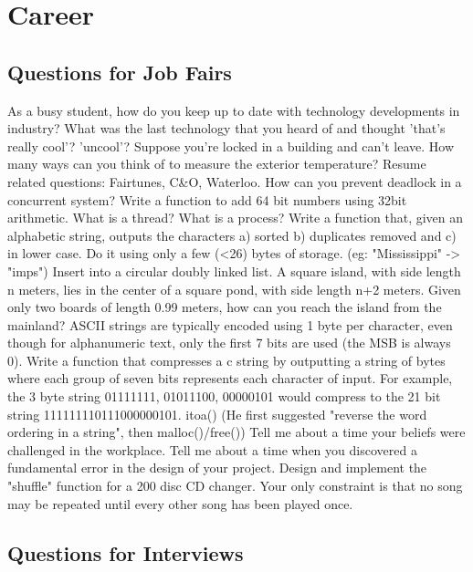 \chapter{Career}
\label{ch:career}

\section{Questions for Job Fairs}
As a busy student, how do you keep up to date with technology developments in industry? 
What was the last technology that you heard of and thought 'that's really cool'? 'uncool'? 
Suppose you're locked in a building and can't leave. How many ways can you think of to measure the exterior temperature? 
Resume related questions: Fairtunes, C\&O, Waterloo. 
How can you prevent deadlock in a concurrent system? 
Write a function to add 64 bit numbers using 32bit arithmetic. 
What is a thread? What is a process? 
Write a function that, given an alphabetic string, outputs the characters a) sorted b) duplicates removed and c) in lower case. Do it using only a few (<26) bytes of storage. (eg: "Mississippi" -> "imps") 
Insert into a circular doubly linked list. 
A square island, with side length n meters, lies in the center of a square pond, with side length n+2 meters. Given only two boards of length 0.99 meters, how can you reach the island from the mainland? 
ASCII strings are typically encoded using 1 byte per character, even though for alphanumeric text, only the first 7 bits are used (the MSB is always 0). Write a function that compresses a c string by outputting a string of bytes where each group of seven bits represents each character of input. For example, the 3 byte string 01111111, 01011100, 00000101 would compress to the 21 bit string 111111110111000000101. 
itoa() (He first suggested "reverse the word ordering in a string", then malloc()/free()) 
Tell me about a time your beliefs were challenged in the workplace. 
Tell me about a time when you discovered a fundamental error in the design of your project. 
Design and implement the "shuffle" function for a 200 disc CD changer. Your only constraint is that no song may be repeated until every other song has been played once. 

\section{Questions for Interviews}

